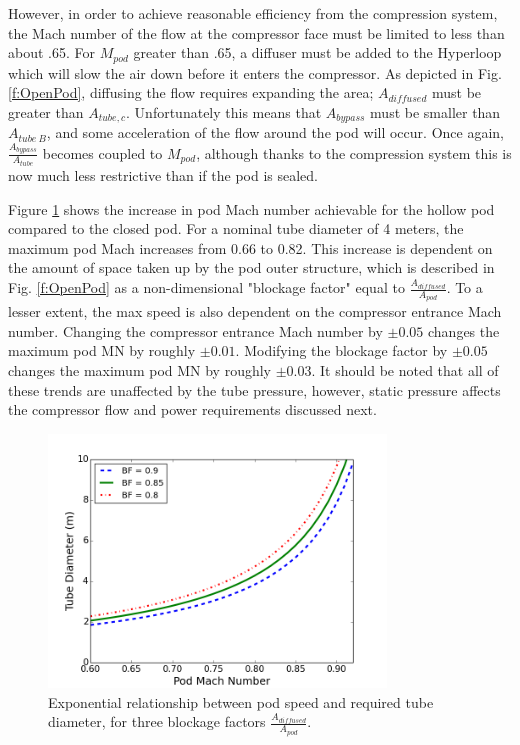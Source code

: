 \documentclass[heading.tex]{subfiles}
\begin{document}
However, in order to achieve reasonable efficiency from the compression system, the Mach number of the flow at the compressor face
must be limited to less than about .65. For $M_{pod}$ greater than .65, a diffuser must be added to the Hyperloop 
which will slow the air down before it enters the compressor. As depicted in Fig. \ref{f:OpenPod}, diffusing the flow 
requires expanding the area; $A_{diffused}$ must be greater than $A_{tube,c}$. Unfortunately this means that
$A_{bypass}$ must be smaller than $A_{tube\ B}$, and some acceleration of the flow around the pod will occur.
Once again, $\frac{A_{bypass}}{A_{tube}}$ becomes coupled to $M_{pod}$, although thanks to the compression 
system this is now much less restrictive than if the pod is sealed. 

Figure \ref{f:machRAD} shows the increase in pod Mach number achievable for the hollow pod compared to the closed pod.
For a nominal tube diameter of 4 meters, the maximum pod Mach increases from 0.66 to 0.82.
This increase is dependent on the amount of space taken up by the pod outer structure, which is described in Fig. \ref{f:OpenPod}
as a non-dimensional "blockage factor" equal to $\frac{A_{diffused}}{A_{pod}}$.
To a lesser extent, the max speed is also dependent on the compressor entrance Mach number.
Changing the compressor entrance Mach number by $\pm 0.05$ changes the maximum pod MN by roughly $\pm 0.01$. 
Modifying the blockage factor by $\pm 0.05$ changes the maximum pod MN by roughly $\pm 0.03$.
It should be noted that all of these trends are unaffected by the tube pressure,
however, static pressure affects the compressor flow and power requirements discussed next.


\begin{figure}[H]
\centering
\includegraphics[width=0.8\textwidth]{images/mach_vs_rad6.png}
\caption[Tube and Pod Radius vs Mach]{Exponential relationship between pod speed and required tube diameter, for three blockage factors $\frac{A_{diffused}}{A_{pod}}$.}
\label{f:machRAD}
\end{figure}
\end{document}
